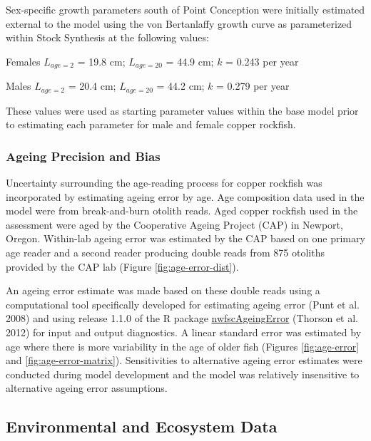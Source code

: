 \documentclass[11pt,
  english,
  letterpaper,
]{article}
\begin{document}
Sex-specific growth parameters south of Point Conception were initially estimated external to the model using the von Bertanlaffy growth curve as parameterized within Stock Synthesis at the following values:

\begin{centering}

Females $L_{age=2}$ = 19.8 cm; $L_{age=20}$ = 44.9 cm; $k$ = 0.243 per year

Males $L_{age=2}$ = 20.4 cm; $L_{age=20}$ = 44.2 cm; $k$ = 0.279 per year

\end{centering}

\vspace{0.50cm}

These values were used as starting parameter values within the base model prior to estimating each parameter for male and female copper rockfish.

\hypertarget{ageing-precision-and-bias}{%
\subsubsection{Ageing Precision and Bias}\label{ageing-precision-and-bias}}

Uncertainty surrounding the age-reading process for copper rockfish was incorporated by estimating ageing error by age. Age composition data used in the model were from break-and-burn otolith reads. Aged copper rockfish used in the assessment were aged by the Cooperative Ageing Project (CAP) in Newport, Oregon. Within-lab ageing error was estimated by the CAP based on one primary age reader and a second reader producing double reads from 875 otoliths provided by the CAP lab (Figure \ref{fig:age-error-dist}).

An ageing error estimate was made based on these double reads using a computational tool specifically developed for estimating ageing error (Punt et al. 2008) and using release 1.1.0 of the R package \href{https://github.com/nwfsc-assess/nwfscAgeingError}{nwfscAgeingError} (Thorson et al. 2012) for input and output diagnostics. A linear standard error was estimated by age where there is more variability in the age of older fish (Figures \ref{fig:age-error} and \ref{fig:age-error-matrix}). Sensitivities to alternative ageing error estimates were conducted during model development and the model was relatively insensitive to alternative ageing error assumptions.

\hypertarget{environmental-and-ecosystem-data}{%
\subsection{Environmental and Ecosystem Data}\label{environmental-and-ecosystem-data}}
\end{document}
